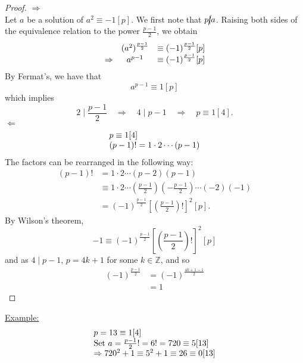 \documentclass{report}
\begin{document}
\begin{proof}
\underline{$\Rightarrow$}\\
Let $a$ be a solution of $a^2 \equiv -1[p]$. We first note that $p\cancel{\mid}a$. Raising both sides of the equivalence relation to the power $\frac{p-1}{2}$, we obtain
\[
\begin{array}{r c l}
&(a^2)^{\frac{p-1}{2}}& \equiv (-1)^{\frac{p-1}{2}}[p]\\
\Rightarrow &a^{p-1}&\equiv (-1)^{\frac{p-1}{2}}[p]
\end{array}
\]
By Fermat's, we have that \[a^{p-1}\equiv 1 [p]\] which implies \[2\mid \frac{p-1}{2}\quad \Rightarrow \quad 4\mid p-1\quad \Rightarrow \quad p\equiv 1[4].\]
\underline{$\Leftarrow$}\\
\[
\begin{array}{l c l}
p \equiv 1[4]\\
(p-1)!=1\cdot 2\cdots (p-1)\\
\end{array}
\]
The factors can be rearranged in the following way:
\begin{equation*}
\begin{aligned}
(p-1)! &= 1\cdot 2\cdots (p-2)(p-1)\\
&\equiv 1\cdot 2\cdots \left(\frac{p-1}{2}\right)\left(-\frac{p-1}{2}\right)\cdots (-2)(-1)\\
&=(-1)^{\frac{p-1}{2}}\left[\left(\frac{p-1}{2}\right)!\right]^2[p].
\end{aligned}
\end{equation*}
By Wilson's theorem, \begin{equation*}
-1\equiv(-1)^{\frac{p-1}{2}}\left[\left(\frac{p-1}{2}\right)!\right]^2[p] 
\end{equation*}
and as $4\mid p-1$, $p=4k + 1$ for some $k\in \mathbb{Z}$, and so \begin{equation*}
\begin{aligned}
(-1)^{\frac{p-1}{2}}&=(-1)^{\frac{4k + 1-1}{2}}\\
&=1
\end{aligned}
\end{equation*}
\end{proof}
\underline{Example:} 
\[
\begin{array}{l c l}
p=13 \equiv 1[4]\\
\text{Set } a=\frac{p-1}{2}!=6!=720 \equiv 5 [13]\\
\Rightarrow 720^2+1 \equiv 5^2+1 \equiv 26 \equiv 0[13]\\
\end{array}
\]
\end{document}
